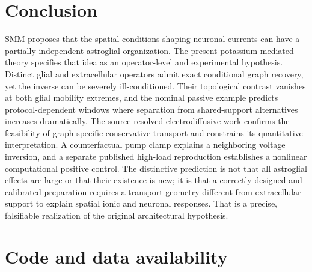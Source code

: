 \documentclass[
  11pt,
]{article}
\begin{document}
\section{Conclusion}\label{conclusion}

SMM proposes that the spatial conditions shaping neuronal currents can
have a partially independent astroglial organization. The present
potassium-mediated theory specifies that idea as an operator-level and
experimental hypothesis. Distinct glial and extracellular operators
admit exact conditional graph recovery, yet the inverse can be severely
ill-conditioned. Their topological contrast vanishes at both glial
mobility extremes, and the nominal passive example predicts
protocol-dependent windows where separation from shared-support
alternatives increases dramatically. The source-resolved
electrodiffusive work confirms the feasibility of graph-specific
conservative transport and constrains its quantitative interpretation. A
counterfactual pump clamp explains a neighboring voltage inversion, and
a separate published high-load reproduction establishes a nonlinear
computational positive control. The distinctive prediction is not that
all astroglial effects are large or that their existence is new; it is
that a correctly designed and calibrated preparation requires a
transport geometry different from extracellular support to explain
spatial ionic and neuronal responses. That is a precise, falsifiable
realization of the original architectural hypothesis.

\section{Code and data availability}\label{code-and-data-availability}
\end{document}
